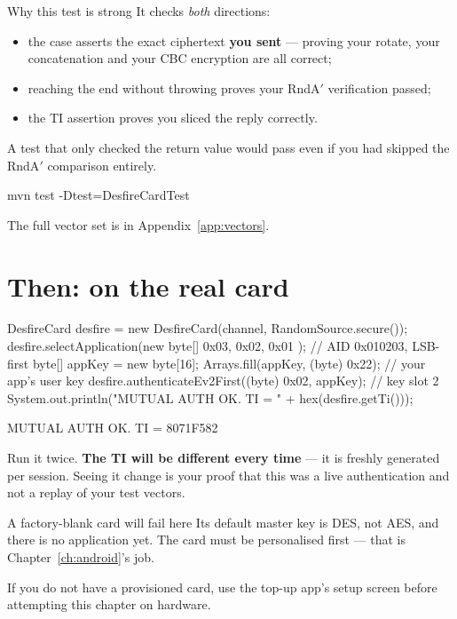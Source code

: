 \begin{concept}{Why this test is strong}
It checks \emph{both} directions:

\begin{itemize}
  \item the  case asserts the exact ciphertext \textbf{you sent} ---
        proving your rotate, your concatenation and your CBC encryption are all
        correct;
  \item reaching the end without throwing proves your RndA$'$ verification passed;
  \item the TI assertion proves you sliced the reply correctly.
\end{itemize}

A test that only checked the return value would pass even if you had skipped the
RndA$'$ comparison entirely.
\end{concept}

\begin{verifybox}
\begin{shell}
mvn test -Dtest=DesfireCardTest
\end{shell}
The full vector set is in Appendix~\ref{app:vectors}.
\end{verifybox}

\section{Then: on the real card}

\begin{jcode}
DesfireCard desfire = new DesfireCard(channel, RandomSource.secure());
desfire.selectApplication(new byte[]{ 0x03, 0x02, 0x01 });  // AID 0x010203, LSB-first
byte[] appKey = new byte[16];
Arrays.fill(appKey, (byte) 0x22);                           // your app's user key
desfire.authenticateEv2First((byte) 0x02, appKey);          // key slot 2
System.out.println("MUTUAL AUTH OK. TI = " + hex(desfire.getTi()));
\end{jcode}

\begin{verifybox}
\begin{trace}
MUTUAL AUTH OK. TI = 8071F582
\end{trace}
Run it twice. \textbf{The TI will be different every time} --- it is freshly
generated per session. Seeing it change is your proof that this was a live
authentication and not a replay of your test vectors.
\end{verifybox}

\begin{trap}{A factory-blank card will fail here}
Its default master key is DES, not AES, and there is no application yet. The card
must be personalised first --- that is Chapter~\ref{ch:android}'s job.

If you do not have a provisioned card, use the top-up app's setup screen before
attempting this chapter on hardware.
\end{trap}

